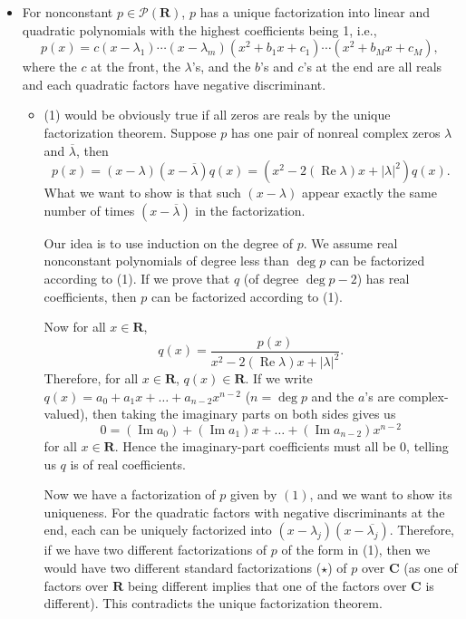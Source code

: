 \documentclass[11pt]{article}
\newcommand{\R}{\mathbf{R}}
\newcommand{\C}{\mathbf{C}}
\renewcommand{\Re}{\operatorname{Re}}
\renewcommand{\Im}{\operatorname{Im}}
\newcommand{\conj}[1]{\overline{#1}}
\newcommand{\abs}[1]{\lvert #1 \rvert}
\begin{document}
\begin{itemize}
    \item For nonconstant $p \in \mathcal{P}(\R)$, $p$ has a unique factorization into linear and quadratic polynomials with the highest coefficients being 1, i.e.,
    \begin{equation}
        p(x)=c(x-\lambda_1)\cdots(x-\lambda_m)(x^2+b_1x+c_1)\cdots(x^2+b_Mx+c_M),
    \end{equation} where the $c$ at the front, the $\lambda$'s, and the $b$'s and $c$'s at the end are all reals and each quadratic factors have negative discriminant.
    \begin{itemize}
        \item (1) would be obviously true if all zeros are reals by the unique factorization theorem. Suppose $p$ has one pair of nonreal complex zeros $\lambda$ and $\conj{\lambda}$, then \[p(x) = (x-\lambda)(x-\conj{\lambda})q(x) = (x^2-2(\Re{\lambda})x+\abs{\lambda}^2)q(x).\] What we want to show is that such $(x - \lambda)$ appear exactly the same number of times $(x - \conj{\lambda})$ in the factorization.
        
        Our idea is to use induction on the degree of $p$. We assume real nonconstant polynomials of degree less than $\deg p$ can be factorized according to (1). If we prove that $q$ (of degree $\deg p-2$) has real coefficients, then $p$ can be factorized according to (1).
        
        Now for all $x \in \R$, \[q(x) = \frac{p(x)}{x^2-2(\Re{\lambda})x+\abs{\lambda}^2}.\] Therefore, for all $x \in \R$, $q(x) \in \R$. If we write $q(x) = a_0+a_1x+\dots+a_{n-2}x^{n-2}$ ($n = \deg p$ and the $a$'s are complex-valued), then taking the imaginary parts on both sides gives us $$0 = (\Im a_0)+(\Im a_1)x+\dots+(\Im a_{n-2})x^{n-2}$$ for all $x \in \R$. Hence the imaginary-part coefficients must all be $0$, telling us $q$ is of real coefficients.
        
        Now we have a factorization of $p$ given by $(1)$, and we want to show its uniqueness. For the quadratic factors with negative discriminants at the end, each can be uniquely factorized into $(x-\lambda_j)(x-\conj{\lambda_j})$. Therefore, if we have two different factorizations of $p$ of the form in (1), then we would have two different standard factorizations ($\star$) of $p$ over $\C$ (as one of factors over $\R$ being different implies that one of the factors over $\C$ is different). This contradicts the unique factorization theorem.
    \end{itemize}
\end{itemize}
\end{document}
